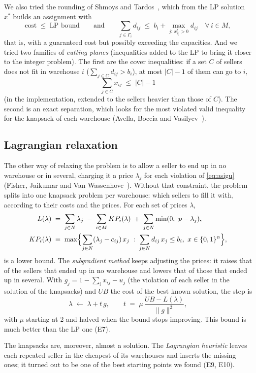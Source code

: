 \documentclass[11pt,a4paper]{article}
\begin{document}
We also tried the rounding of Shmoys and Tardos~\cite{shmoys1993}, which from the LP solution $x^*$
builds an assignment with
\[
  \text{cost} \;\le\; \text{LP bound}
  \qquad\text{and}\qquad
  \sum_{j\in\Gamma_i} d_{ij} \;\le\; b_i + \max_{j:\,x^*_{ij}>0} d_{ij}\quad \forall\, i\in M,
\]
that is, with a guaranteed cost but possibly exceeding the capacities. And we tried two families
of \emph{cutting planes} (inequalities added to the LP to bring it closer to the integer problem).
The first are the cover inequalities: if a set $C$ of sellers does not fit in warehouse $i$
($\sum_{j\in C} d_{ij} > b_i$), at most $|C|-1$ of them can go to $i$,
\[
  \sum_{j\in C} x_{ij} \;\le\; |C|-1
\]
(in the implementation, extended to the sellers heavier than those of $C$). The second is an exact
separation, which looks for the most violated valid inequality for the knapsack of each warehouse
(Avella, Boccia and Vasilyev~\cite{avella2010}).

\subsection{Lagrangian relaxation}
The other way of relaxing the problem is to allow a seller to end up in no warehouse or in several,
charging it a price $\lambda_j$ for each violation of \eqref{eq:asigu} (Fisher, Jaikumar and Van
Wassenhove~\cite{fisher1986}). Without that constraint, the problem splits into one knapsack
problem per warehouse: which sellers to fill it with, according to their costs and the prices. For
each set of prices $\lambda$,
\begin{align*}
  L(\lambda) &\;=\; \sum_{j\in N}\lambda_j \;-\; \sum_{i\in M} KP_i(\lambda) \;+\; \sum_{j\in N}\min(0,\ p-\lambda_j),\\
  KP_i(\lambda) &\;=\; \max\Bigl\{\sum_{j\in N} (\lambda_j-c_{ij})\,x_j \;:\; \sum_{j\in N} d_{ij}\,x_j\le b_i,\ x\in\{0,1\}^n\Bigr\},
\end{align*}
is a lower bound. The \emph{subgradient method} keeps adjusting the prices: it raises that of the
sellers that ended up in no warehouse and lowers that of those that ended up in several. With
$g_j = 1-\sum_i x_{ij}-u_j$ (the violation of each seller in the solution of the knapsacks) and $UB$
the cost of the best known solution, the step is
\[
  \lambda \;\gets\; \lambda + t\,g, \qquad t \;=\; \mu\,\frac{UB - L(\lambda)}{\|g\|^2},
\]
with $\mu$ starting at 2 and halved when the bound stops improving. This bound is much better than
the LP one (E7).

The knapsacks are, moreover, almost a solution. The \emph{Lagrangian heuristic} leaves each
repeated seller in the cheapest of its warehouses and inserts the missing ones; it turned out to be
one of the best starting points we found (E9, E10).
\end{document}
